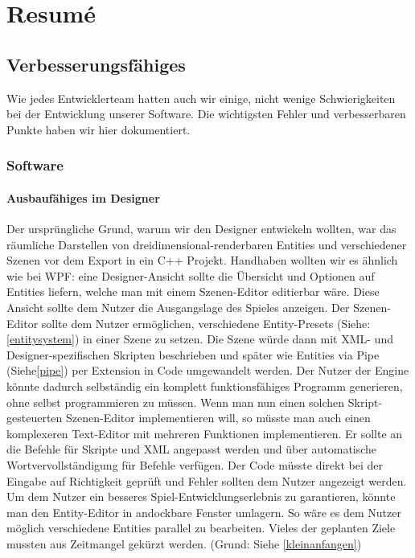 \chapter{Resumé}

\section{Verbesserungsfähiges}
 Wie jedes Entwicklerteam hatten auch wir einige, nicht wenige Schwierigkeiten bei der Entwicklung unserer Software. Die wichtigsten Fehler und verbesserbaren Punkte haben wir hier dokumentiert.

\subsection{Software}
\subsubsection{Ausbaufähiges im Designer}
Der ursprüngliche Grund, warum wir den Designer entwickeln wollten, war das räumliche Darstellen von dreidimensional-renderbaren Entities und verschiedener Szenen vor dem Export in ein C++ Projekt. Handhaben wollten wir es ähnlich wie bei WPF: eine Designer-Ansicht sollte die Übersicht und Optionen auf Entities liefern, welche man mit einem Szenen-Editor editierbar wäre. Diese Ansicht sollte dem Nutzer die Ausgangslage des Spieles anzeigen.
Der Szenen-Editor sollte dem Nutzer ermöglichen, verschiedene Entity-Presets (Siehe: \cref{entitysystem}) in einer Szene zu setzen. Die Szene würde dann mit XML- und Designer-spezifischen Skripten beschrieben und später wie Entities via Pipe (Siehe\cref{pipe}) per Extension in Code umgewandelt werden.
Der Nutzer der Engine könnte dadurch selbständig ein komplett funktionsfähiges Programm generieren, ohne selbst programmieren zu müssen.
Wenn man nun einen solchen Skript-gesteuerten Szenen-Editor implementieren will, so müsste man auch einen komplexeren Text-Editor mit mehreren Funktionen implementieren. Er sollte an die Befehle für Skripte und XML angepasst werden und über automatische Wortvervollständigung für Befehle verfügen. Der Code müsste direkt bei der Eingabe auf Richtigkeit geprüft und Fehler sollten dem Nutzer angezeigt werden.
Um dem Nutzer ein besseres Spiel-Entwicklungserlebnis zu garantieren, könnte man den Entity-Editor in andockbare Fenster umlagern. So wäre es dem Nutzer möglich verschiedene Entities parallel zu bearbeiten.
Vieles der geplanten Ziele mussten aus Zeitmangel gekürzt werden. (Grund: Siehe \cref{kleinanfangen})
	
